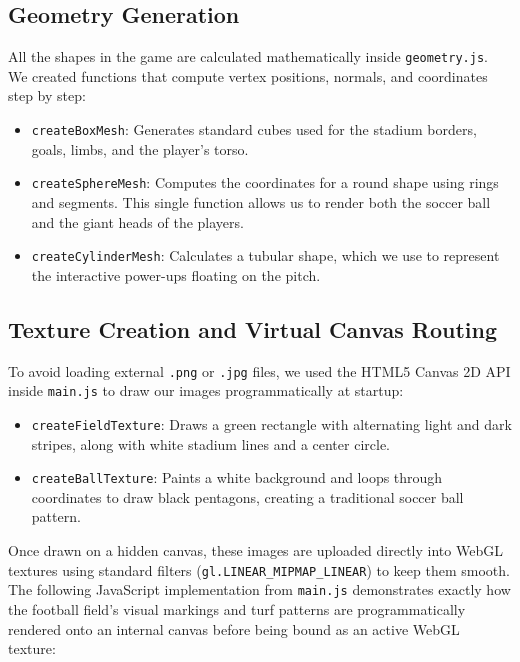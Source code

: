 \subsection{Geometry Generation}
All the shapes in the game are calculated mathematically inside \texttt{geometry.js}. We created functions that compute vertex positions, normals, and coordinates step by step:
\begin{itemize}
    \item \texttt{createBoxMesh}: Generates standard cubes used for the stadium borders, goals, limbs, and the player's torso.
    \item \texttt{createSphereMesh}: Computes the coordinates for a round shape using rings and segments. This single function allows us to render both the soccer ball and the giant heads of the players.
    \item \texttt{createCylinderMesh}: Calculates a tubular shape, which we use to represent the interactive power-ups floating on the pitch.
\end{itemize}

\subsection{Texture Creation and Virtual Canvas Routing}
To avoid loading external \texttt{.png} or \texttt{.jpg} files, we used the HTML5 Canvas 2D API inside \texttt{main.js} to draw our images programmatically at startup:
\begin{itemize}
    \item \texttt{createFieldTexture}: Draws a green rectangle with alternating light and dark stripes, along with white stadium lines and a center circle.
    \item \texttt{createBallTexture}: Paints a white background and loops through coordinates to draw black pentagons, creating a traditional soccer ball pattern.
\end{itemize}

Once drawn on a hidden canvas, these images are uploaded directly into WebGL textures using standard filters (\texttt{gl.LINEAR\_MIPMAP\_LINEAR}) to keep them smooth. The following JavaScript implementation from \texttt{main.js} demonstrates exactly how the football field's visual markings and turf patterns are programmatically rendered onto an internal canvas before being bound as an active WebGL texture:


